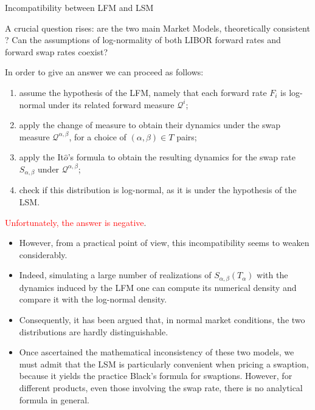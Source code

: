 \documentclass{beamer}
\begin{document}
\begin{frame}{Incompatibility between LFM and LSM}

A crucial question rises: are the two main Market Models, theoretically consistent ? 
Can the assumptions of log-normality of both LIBOR forward rates and forward swap rates coexist? 

In order to give an answer we can proceed as follows:
\begin{enumerate}
\item assume the hypothesis of the LFM, namely that each forward rate $F_i$ is log-normal under its related forward measure $\mathcal{Q}^i$;
\item apply the change of measure to obtain their dynamics under the swap measure $\mathcal{Q}^{\alpha,\beta}$, for a choice of $(\alpha,\beta) \in T$ pairs;
\item apply the It$\hat{o}$’s formula to obtain the resulting dynamics for the swap rate $S_{\alpha,\beta}$ under $\mathcal{Q}^{\alpha,\beta}$;
\item check if this distribution is log-normal, as it is under the hypothesis of the LSM.
\end{enumerate}
\textcolor{red}{Unfortunately, the answer is negative}. 
\end{frame}

\begin{frame}
\begin{itemize}
\item However, from a practical point of view, this incompatibility seems to weaken considerably. 
\item Indeed, simulating a large number of realizations of $S_{\alpha,\beta}(T_\alpha)$ with the dynamics induced by the LFM one can compute its numerical density and compare it with the log-normal density. 
\item Consequently, it has been argued that, in normal market conditions, the two distributions are hardly distinguishable.
\item Once ascertained the mathematical inconsistency of these two models, we must admit that the LSM is particularly convenient when pricing a swaption, because it yields the practice Black’s formula for swaptions. However, for different products, even those involving the swap rate, there is no analytical formula in general. 
\end{itemize}
\end{frame}
\end{document}
